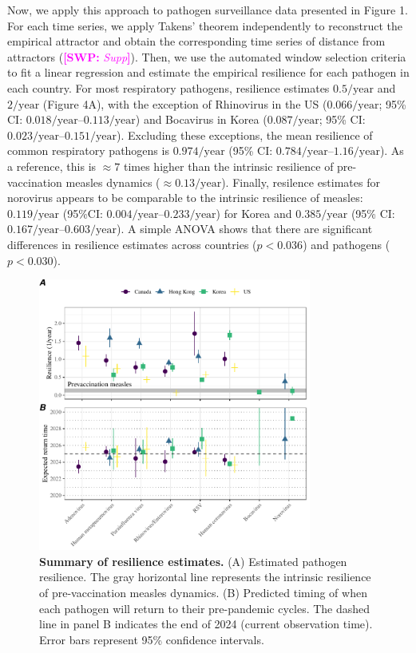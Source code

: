 \documentclass[12pt]{article}
\newcommand{\comment}{\showcomment}
\newcommand{\showcomment}[3]{\textcolor{#1}{\textbf{[#2: }\textsl{#3}\textbf{]}}}
\newcommand{\swp}[1]{\comment{magenta}{SWP}{#1}}
\begin{document}
Now, we apply this approach to pathogen surveillance data presented in Figure 1.
For each time series, we apply Takens' theorem independently to reconstruct the empirical attractor and obtain the corresponding time series of distance from attractors (\swp{Supp}).
Then, we use the automated window selection criteria to fit a linear regression and estimate the empirical resilience for each pathogen in each country.
For most respiratory pathogens, resilience estimates $0.5/\mathrm{year}$ and $2/\mathrm{year}$ (Figure 4A), with the exception of Rhinovirus in the US ($0.066/\mathrm{year}$; 95\% CI: $0.018/\mathrm{year}$--$0.113/\mathrm{year}$) and Bocavirus in Korea ($0.087/\mathrm{year}$; 95\% CI: $0.023/\mathrm{year}$--$0.151/\mathrm{year}$).
Excluding these exceptions, the mean resilience of common respiratory pathogens is $0.974/\mathrm{year}$ (95\% CI: $0.784/\mathrm{year}$--$1.16/\mathrm{year}$).
As a reference, this is $\approx 7$ times higher than the intrinsic resilience of pre-vaccination measles dynamics ($\approx 0.13/\mathrm{year}$).
Finally, resilence estimates for norovirus appears to be comparable to the intrinsic resilience of measles: $0.119/\mathrm{year}$ (95\%CI: $0.004/\mathrm{year}$--$0.233/\mathrm{year}$) for Korea and $0.385/\mathrm{year}$ (95\% CI: $0.167/\mathrm{year}$--$0.603/\mathrm{year}$).
A simple ANOVA shows that there are significant differences in resilience estimates across countries ($p<0.036$) and pathogens ($p<0.030$).

\begin{figure}[!th]
\begin{center}
\includegraphics[width=0.8\textwidth]{../figure4/figure4.pdf}
\caption{
\textbf{Summary of resilience estimates.}
(A) Estimated pathogen resilience.
The gray horizontal line represents the intrinsic resilience of pre-vaccination measles dynamics.
(B) Predicted timing of when each pathogen will return to their pre-pandemic cycles.
The dashed line in panel B indicates the end of 2024 (current observation time).
Error bars represent 95\% confidence intervals.
}
\end{center}
\end{figure}
\end{document}
